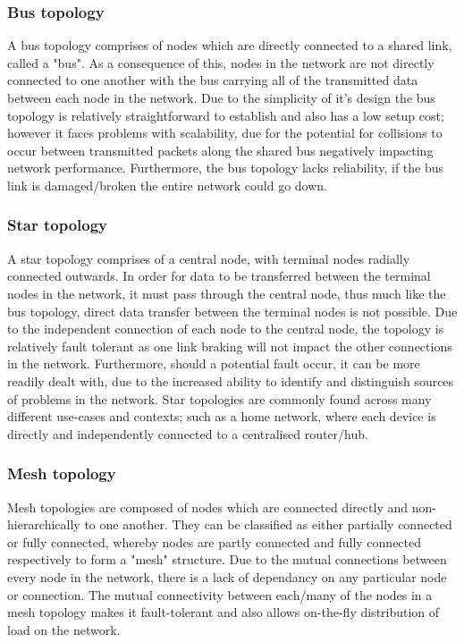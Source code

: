 \subsubsection{Bus topology}
A bus topology comprises of nodes which are directly connected to a shared link, called a "bus". As a consequence of this, nodes in the network are not directly connected to one another with the bus carrying all of the transmitted data between each node in the network. Due to the simplicity of it's design the bus topology is relatively straightforward to establish and also has a low setup cost; however it faces problems with scalability, due for the potential for collisions to occur between transmitted packets along the shared bus negatively impacting network performance. Furthermore, the bus topology lacks reliability, if the bus link is damaged/broken the entire network could go down. 

\subsubsection{Star topology}
A star topology comprises of a central node, with terminal nodes radially connected outwards. In order for data to be transferred  between the terminal nodes in the network, it must pass through the central node, thus much like the bus topology, direct data transfer between the terminal nodes is not possible. \cite{star_zig} Due to the independent connection of each node to the central node, the topology is relatively fault tolerant as one link braking will not impact the other connections in the network. Furthermore, should a potential fault occur, it can be more readily dealt with, due to the increased ability to identify and distinguish sources of problems in the network. Star topologies are commonly found across many different use-cases and contexts; such as a  home network, where each device is directly and independently connected to a centralised router/hub. 

\subsubsection{Mesh topology}
Mesh topologies are composed of nodes which are connected directly and non-hierarchically to one another. They can be classified as either partially connected or fully connected, whereby nodes are partly connected and fully connected respectively to form a "mesh" structure. Due to the mutual connections between every node in the network, there is a lack of dependancy on any particular node or connection. The mutual connectivity between each/many of the nodes in a mesh topology makes it fault-tolerant and also allows on-the-fly distribution of load on the network. \cite{mesh_paper}

